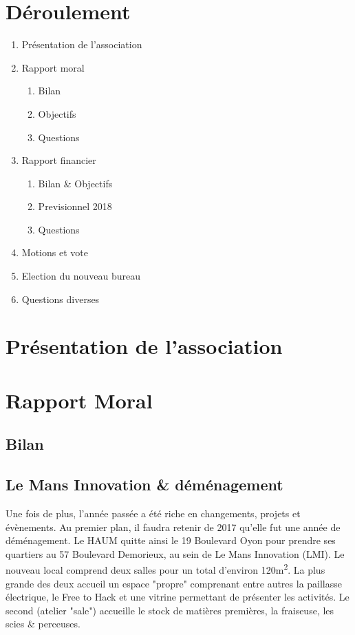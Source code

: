 \documentclass[11pt]{article}
\begin{document}
\vspace{1.5cm}

\section*{Déroulement}

\begin{enumerate}
    \item Présentation de l'association
    \item Rapport moral
        \begin{enumerate}
            \item Bilan
            \item Objectifs
            \item Questions
        \end{enumerate}
    \item Rapport financier
        \begin{enumerate}
            \item Bilan \& Objectifs
            \item Previsionnel 2018
            \item Questions
        \end{enumerate}
    \item Motions et vote
    \item Election du nouveau bureau
    \item Questions diverses
\end{enumerate}

\section{Présentation de l'association}

\section{Rapport Moral}

\subsection{Bilan}

\subsection{Le Mans Innovation \& déménagement}
Une fois de plus, l'année passée a été riche en changements, projets et évènements. Au
premier plan, il faudra retenir de 2017 qu'elle fut une année de déménagement. Le HAUM
quitte ainsi le 19 Boulevard Oyon pour prendre ses quartiers au 57 Boulevard Demorieux, au
sein de Le Mans Innovation (LMI).
Le nouveau local comprend deux salles pour un total d'environ 120m\textsuperscript{2}. La
plus grande des deux accueil un espace "propre" comprenant entre autres la paillasse
électrique, le Free to Hack et une vitrine permettant de présenter les activités. Le
second (atelier "sale") accueille le stock de matières premières, la fraiseuse, les scies & perceuses.
\end{document}
